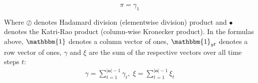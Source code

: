 \begin{equation}
    {\pi} = {\gamma}_1
    \label{eq:initial-probabilities-update}
\end{equation}

Where $\oslash$ denotes Hadamard division (elementwise division) product and $\bullet$ denotes the Katri-Rao product (column-wise Kronecker product).
In the formulas above, $\mathbbm{1}$ denotes a column vector of ones, $\mathbbm{1}_{yt}$ denotes a row vector of ones, $\gamma$ and $\xi$ are the sum of the respective vectors over all time steps $t$:
\begin{align}
    \gamma = \sum_{t=1}^{|\mathbf{o}|-1} \gamma_t, \;
    \xi = \sum_{t=1}^{|\mathbf{o}|-1} \xi_t
\end{align} 

